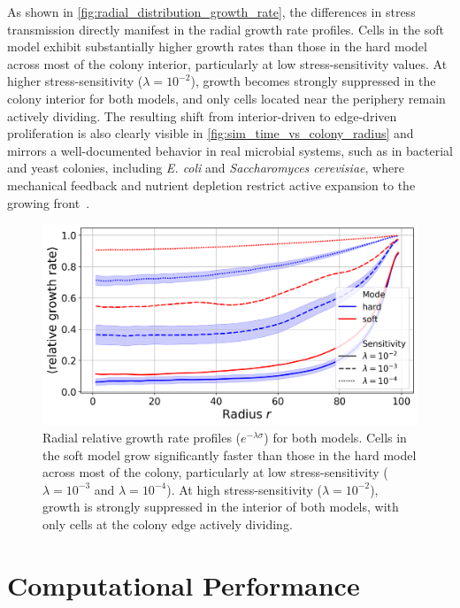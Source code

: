 \documentclass[conference]{IEEEtran}
\begin{document}
As shown in \autoref{fig:radial_distribution_growth_rate}, the differences in stress transmission directly manifest in the radial growth rate profiles. Cells in the soft model exhibit substantially higher growth rates than those in the hard model across most of the colony interior, particularly at low stress-sensitivity values. At higher stress-sensitivity ($\lambda = 10^{-2}$), growth becomes strongly suppressed in the colony interior for both models, and only cells located near the periphery remain actively dividing. The resulting shift from interior-driven to edge-driven proliferation is also clearly visible in \autoref{fig:sim_time_vs_colony_radius} and mirrors a well-documented behavior in real microbial systems, such as in bacterial and yeast colonies, including \textit{E. coli} and \textit{Saccharomyces cerevisiae}, where mechanical feedback and nutrient depletion restrict active expansion to the growing front~\cite{Warren2019,Hallatschek2007,Giometto2018}.

\begin{figure}[H]
    \centering
    \includegraphics[width=\linewidth]{figures/comparison_plots/combined_radial_impedance.png}
    \caption{Radial relative growth rate profiles ($e^{-\lambda \sigma}$) for both models. Cells in the soft model grow significantly faster than those in the hard model across most of the colony, particularly at low stress-sensitivity ($\lambda = 10^{-3}$ and $\lambda = 10^{-4}$). At high stress-sensitivity ($\lambda = 10^{-2}$), growth is strongly suppressed in the interior of both models, with only cells at the colony edge actively dividing.}
    \label{fig:radial_distribution_growth_rate}
\end{figure}

\section{Computational Performance}
\label{sec:performance_analysis}
\end{document}
